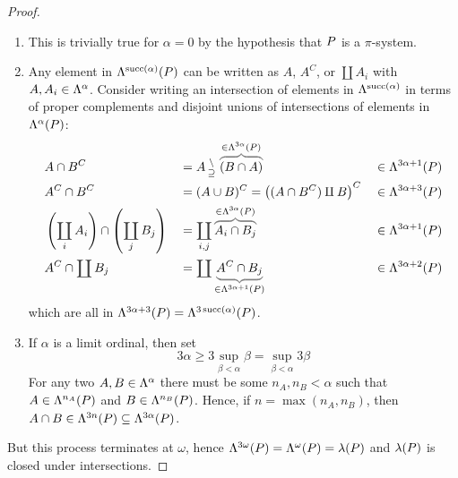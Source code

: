 \documentclass{scrartcl}
\newcommand{\propersetminus}{\begin{smallmatrix} \setminus\\\supseteq \end{smallmatrix}}%
\DeclareMathOperator*{\bigdisjunion}{\coprod}
\newcommand{\disjunion}{\amalg}
\DeclareMathOperator{\successor}{succ}
\begin{document}
\begin{proof}
  \begin{enumerate}
  \item This is trivially true for \(\alpha=0\) by the hypothesis that \(P\) is a \(\pi\)-system.
  \item Any element in \(\lambdify^{\successor(\alpha)}(\pisystem)\) can be written as
    \(A\), \(A^C\), or \(\bigdisjunion A_i\) with \(A,A_i\in\Lambda^{\alpha}\).
    Consider writing an intersection of elements in
    \(\lambdify^{\successor(\alpha)}\) in terms of proper complements and disjoint
    unions of intersections of elements in \(\Lambda^\alpha(P)\):
      \begin{align*}
        &A\cap B^C &&= A\propersetminus \grayoverbrace{(B\cap A)}{\in \lambdify^{3\alpha}(\pisystem)} &&\in \lambdify^{3\alpha+1}(\pisystem) \\
        &A^C\cap B^C &&= (A\cup B)^C = \left((A\cap B^C)\disjunion B  \right)^C &&\in \lambdify^{3\alpha+3}(\pisystem) \\
        & \left(\bigdisjunion_{i} A_i\right) \cap
        \left(\bigdisjunion_j B_j\right) &&= \bigdisjunion_{i,j}
        \grayoverbrace{A_i\cap B_j}{\in\lambdify^{3\alpha}(\pisystem)} &&\in
        \lambdify^{3\alpha+1}(\pisystem) \\
       & A^C \cap \bigdisjunion B_j &&= \bigdisjunion \grayunderbrace{A^C\cap
           B_j}{\in\lambdify^{3\alpha+1}(\pisystem)} &&\in\lambdify^{3\alpha+2}(\pisystem)
      \end{align*}
    which are all in \(\lambdify^{3\alpha+3}(\pisystem)=\lambdify^{3\successor(\alpha)}(\pisystem)\).
  \item
    If \(\alpha\) is a limit ordinal, then set
    \[
      3\alpha \geq 3\sup_{\beta <\alpha}\beta = \sup_{\beta <
        \alpha}3\beta
    \]
    For any two \(A,B\in\Lambda^\alpha\) there must be some \(n_A,n_B<\alpha\)
    such that \(A\in \Lambda^{n_A}(P)\) and
    \(B\in\Lambda^{n_B}(P)\). Hence, if \(n=\max(n_A,n_B)\), then
    \(A\cap B\in \Lambda^{3n}(P)\subseteq
    \Lambda^{3\alpha}(P)\).
  \end{enumerate}
  But this process terminates at \(\omega\), hence
  \(\Lambda^{3\omega}(P)=\Lambda^\omega(P)=\lambda(P)\)
  and \(\lambda(P)\) is closed under intersections.
\end{proof}
\end{document}
